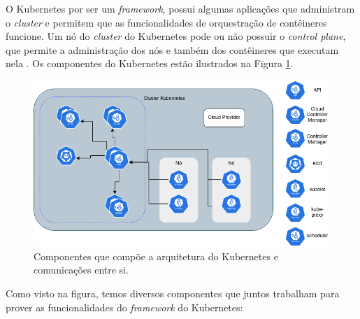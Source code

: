 O Kubernetes por ser um \textit{framework}, possui algumas aplicações que
administram o \textit{cluster} e permitem que as funcionalidades de orquestração
de contêineres funcione. Um nó do \textit{cluster} do Kubernetes pode ou não
possuir o \textit{control plane}, que permite a administração dos nós e também
dos contêineres que executam nela \cite{kubernetes:components}. Os componentes
do Kubernetes estão ilustrados na Figura \ref{fig:kubernetes:components}.

\begin{figure}[h]
\centering
\includegraphics[scale=0.54]{images/kubernetes-components.png}
\caption{Componentes que compõe a arquitetura do Kubernetes e comunicações entre si.}
\label{fig:kubernetes:components}
\end{figure}

Como visto na figura, temos diversos componentes que juntos trabalham para
prover as funcionalidades do \textit{framework} do Kubernetes:

